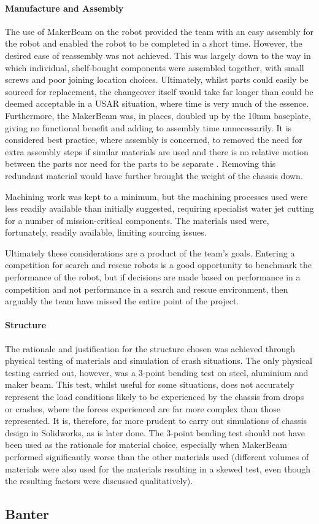 \paragraph{Manufacture and Assembly}
The use of MakerBeam\textsuperscript{\textregistered} on the robot provided the team with an easy assembly for the robot and enabled the robot to be completed in a short time. However, the desired ease of reassembly was not achieved. This was largely down to the way in which individual, shelf-bought components were assembled together, with small screws and poor joining location choices. Ultimately, whilst parts could easily be sourced for replacement, the changeover itself would take far longer than could be deemed acceptable in a USAR situation, where time is very much of the essence. Furthermore, the MakerBeam\textsuperscript{\textregistered} was, in places, doubled up by the 10mm baseplate, giving no functional benefit and adding to assembly time unnecessarily. It is considered best practice, where assembly is concerned, to removed the need for extra assembly steps if similar materials are used and there is no relative motion between the parts nor need for the parts to be separate \cite{Boothroyd10}. Removing this redundant material would have further brought the weight of the chassis down. \par
Machining work was kept to a minimum, but the machining processes used were less readily available than initially suggested, requiring specialist water jet cutting for a number of mission-critical components. The materials used were, fortunately, readily available, limiting sourcing issues. \par
Ultimately these considerations are a product of the team’s goals. Entering a competition for search and rescue robots is a good opportunity to benchmark the performance of the robot, but if decisions are made based on performance in a competition and not performance in a search and rescue environment, then arguably the team have missed the entire point of the project.\par
\paragraph{Structure}
The rationale and justification for the structure chosen was achieved through physical testing of materials and simulation of crash situations. The only physical testing carried out, however, was a 3-point bending test on steel, aluminium and maker beam. This test, whilst useful for some situations, does not accurately represent the load conditions likely to be experienced by the chassis from drops or crashes, where the forces experienced are far more complex than those represented. It is, therefore, far more prudent to carry out simulations of chassis design in Solidworks\textsuperscript{\textregistered}, as is later done. The 3-point bending test should not have been used as the rationale for material choice, especially when MakerBeam\textsuperscript{\textregistered} performed significantly worse than the other materials used (different volumes of materials were also used for the materials resulting in a skewed test, even though the resulting factors were discussed qualitatively).



\subsection{Banter}
